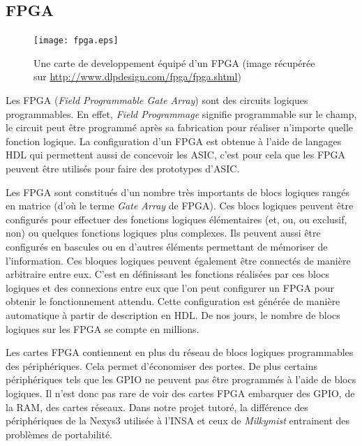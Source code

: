 \subsection{FPGA}

\begin{figure}[h!]
\begin{center}
\texttt{[image: fpga.eps]}
\end{center}
\caption{Une carte de developpement équipé d'un FPGA (image récupérée sur \url{http://www.dlpdesign.com/fpga/fpga.shtml})}
\end{figure}

Les FPGA (\textit{Field Programmable Gate Array}) sont des circuits logiques
programmables. En effet, \textit{Field Programmage} signifie programmable sur le champ,
le circuit peut être programmé après sa fabrication pour réaliser n'importe quelle
fonction logique. La configuration d'un FPGA est obtenue à l'aide de langages HDL
qui permettent aussi de concevoir les ASIC, c'est pour cela que les FPGA peuvent être
utilisés pour faire des prototypes d'ASIC.

Les FPGA sont constitués d'un nombre très importants de blocs logiques rangés en
matrice (d'où le terme \textit{Gate Array} de FPGA). Ces blocs logiques peuvent être
configurés pour effectuer des fonctions logiques élémentaires (et, ou, ou exclusif,
non) ou quelques fonctions logiques plus complexes. Ils peuvent aussi être configurés
en bascules ou en d'autres éléments permettant de mémoriser de l'information. Ces
bloques logiques peuvent également être connectés de manière arbitraire entre eux.
C'est en définissant les fonctions réalisées par ces blocs logiques et des
connexions entre eux que l'on peut configurer un FPGA pour obtenir le fonctionnement
attendu. Cette configuration est générée de manière automatique à partir de
description en HDL. De nos jours, le nombre de blocs logiques sur les FPGA se compte
en millions. 

Les cartes FPGA contiennent en plus du réseau de blocs logiques programmables des
périphériques. Cela permet d'économiser des portes. De plus certains périphériques
tels que les GPIO ne peuvent pas être programmés à l'aide de blocs logiques. Il
n'est donc pas rare de voir des cartes FPGA embarquer des GPIO, de la RAM, des
cartes réseaux. Dans notre projet tutoré, la différence des
périphériques de la Nexys3 utilisée à l'INSA et ceux de \textit{Milkymist} entrainent des problèmes de portabilité.


